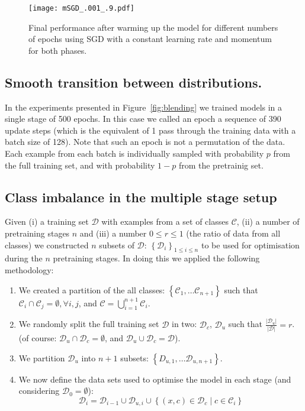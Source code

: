 \begin{figure}[h!tb]
    \centering%
    \texttt{[image: mSGD\_.001\_.9.pdf]}
    \caption{Final performance after warming up the model for different numbers of epochs using SGD with a constant learning rate and momentum for both phases.}
    \label{fig:msgd}
\end{figure}

\subsection{Smooth transition between distributions.}
\label{sec:blending}

In the experiments presented in Figure~\ref{fig:blending} we trained models in a single stage of 500 epochs.
In this case we called an epoch a sequence of 390 update steps (which is the equivalent of 1 pass through the training data with a batch size of 128). Note that such an epoch is not a permutation of the data. Each example from each batch is individually sampled with probability $p$ from the full training set, and with probability $1-p$ from the pretrainig set.

\subsection{Class imbalance in the multiple stage setup}
\label{sec:splits}

Given (i) a training set $\mathcal{D}$ with examples from a set of classes $\mathcal{C}$, (ii) a number of pretraining stages $n$ and (iii) a number $0 \le r \le 1$ (the ratio of data from all classes) we constructed $n$ subsets of $\mathcal{D}$: $\left\lbrace\mathcal{D}_i\right\rbrace_{1 \le i \le n}$ to be used for optimisation during the $n$ pretraining stages. In doing this we applied the following methodology:
\begin{enumerate}
    \item We created a partition of the all classes: $\left\lbrace \mathcal{C}_1, \ldots \mathcal{C}_{n + 1} \right\rbrace$ such that $\mathcal{C}_i \cap \mathcal{C}_j = \emptyset, \forall i, j$, and $\mathcal{C} = \bigcup_{i=1}^{n+1} \mathcal{C}_{i}$.
    \item We randomly split the full training set $\mathcal{D}$ in two: $\mathcal{D}_{c}$, $\mathcal{D}_{u}$ such that $\frac{\vert\mathcal{D}_{u}\vert}{\vert\mathcal{D}\vert} = r$. (of course: $\mathcal{D}_{u} \cap \mathcal{D}_{c} = \emptyset$, and $\mathcal{D}_{u} \cup \mathcal{D}_{c} = \mathcal{D}$).
    \item We partition $\mathcal{D}_{u}$ into $n+1$ subsets: $\left\lbrace D_{u,1}, \ldots \mathcal{D}_{u, n+1} \right\rbrace$.
    \item We now define the data sets used to optimise the model in each stage (and considering $\mathcal{D}_{0}=\emptyset$):
    $$ \mathcal{D}_i = \mathcal{D}_{i-1} \cup \mathcal{D}_{u, i} \cup \left\lbrace \left(x, c\right) \in \mathcal{D}_{c} \mid c \in \mathcal{C}_i \right\rbrace$$
\end{enumerate}

